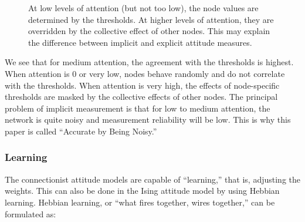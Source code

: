\documentclass[
  a4paper,
  DIV=11,
  numbers=noendperiod,
  oneside]{scrreprt}
\begin{document}
\begin{figure}


\caption{\label{fig-ch6-img13-old-82}At low levels of attention (but not
too low), the node values are determined by the thresholds. At higher
levels of attention, they are overridden by the collective effect of
other nodes. This may explain the difference between implicit and
explicit attitude measures.}

\end{figure}%

We see that for medium attention, the agreement with the thresholds is
highest. When attention is 0 or very low, nodes behave randomly and do
not correlate with the thresholds. When attention is very high, the
effects of node-specific thresholds are masked by the collective effects
of other nodes. The principal problem of implicit measurement is that
for low to medium attention, the network is quite noisy and measurement
reliability will be low. This is why this paper is called ``Accurate by
Being Noisy.''

\subsubsection{Learning}\label{sec-Learning}

The connectionist attitude models are capable of ``learning,'' that is,
adjusting the weights. This can also be done in the Ising attitude model
by using Hebbian learning. Hebbian learning, or ``what fires together,
wires together,'' can be formulated as:
\end{document}
